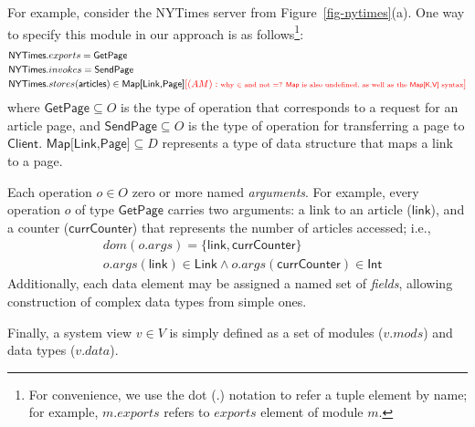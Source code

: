 For example, consider the \textsf{NYTimes} server from
Figure~\ref{fig-nytimes}(a). One way to specify this module in our
approach is as follows\footnote{For convenience, we use the dot
  (.) notation to refer a tuple element by name; for example,
  $m.exports$ refers to $exports$ element of module $m$.}:
\begin{align*}
&\textsf{NYTimes}.exports = \textsf{GetPage}\\
&\textsf{NYTimes}.invokes = \textsf{SendPage}\\
&\textsf{NYTimes}.stores(\textsf{articles}) \in
\textsf{Map[Link,Page]} \am{\mbox{why $\in$ and not $=$? \textsf{Map} is also undefined, as well as the \textsf{Map[K,V]} syntax}}
\end{align*}
where $\textsf{GetPage} \subseteq O$ is the type of operation that
corresponds to a request for an article page, and $\textsf{SendPage}
\subseteq O$ is the type of operation for transferring a page to
$\textsf{Client}$. $\textsf{Map[Link,Page]} \subseteq D$ represents a
type of data structure that maps a link to a page. 

Each operation $o \in O$  zero or more
named \textit{arguments}. For example, every operation $o$ of type
$\textsf{GetPage}$ carries two arguments: a link to an article
($\textsf{link}$), and a counter ($\textsf{currCounter}$) that
represents the number of articles accessed; i.e.,
\begin{align*}
  &dom(o.args) = \{ \textsf{link}, \textsf{currCounter} \} \\
  &o.args(\textsf{link}) \in \textsf{Link} \land
  o.args(\textsf{currCounter}) \in \textsf{Int}
\end{align*}
Additionally, each data element may be assigned a named set of
\textit{fields}, allowing construction of complex data types from
simple ones.

Finally, a system view $v \in V$ is simply defined as a set of modules
($v.mods$) and data types ($v.data$). 

